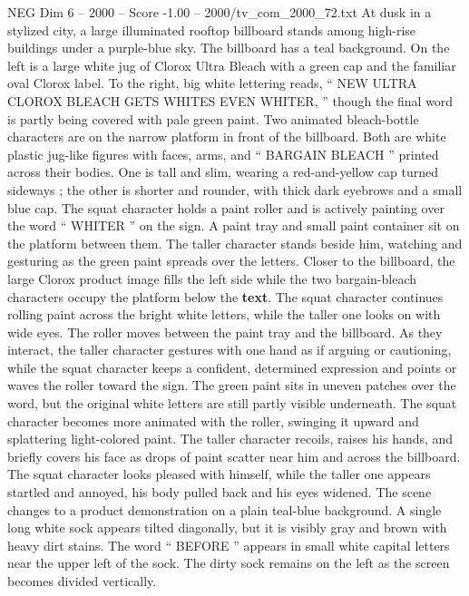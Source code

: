 \begin{textsample}{NEG Dim 6 – 2000 – Score -1.00 – 2000/tv\_com\_2000\_72.txt}  \label{ex:f6_neg_049}
At dusk in a stylized city, a large illuminated rooftop billboard stands among high-rise buildings under a purple-blue sky.
The billboard has a teal background.
On the left is a large white jug of Clorox Ultra Bleach with a green cap and the familiar oval Clorox label.
To the right, big white lettering reads, “ NEW ULTRA CLOROX BLEACH GETS WHITES EVEN WHITER, ” though the final word is partly being covered with pale green paint.
Two animated bleach-bottle characters are on the narrow platform in front of the billboard.
Both are white plastic jug-like figures with faces, arms, and “ BARGAIN BLEACH ” printed across their bodies.
One is tall and slim, wearing a red-and-yellow cap turned sideways ; the other is shorter and rounder, with thick dark eyebrows and a small blue cap.
The squat character holds a paint roller and is actively painting over the word “ WHITER ” on the sign.
A paint tray and small paint container sit on the platform between them.
The taller character stands beside him, watching and gesturing as the green paint spreads over the letters.
Closer to the billboard, the large Clorox product image fills the left side while the two bargain-bleach characters occupy the platform below the \textbf{text}.
The squat character continues rolling paint across the bright white letters, while the taller one looks on with wide eyes.
The roller moves between the paint tray and the billboard.
As they interact, the taller character gestures with one hand as if arguing or cautioning, while the squat character keeps a confident, determined expression and points or waves the roller toward the sign.
The green paint sits in uneven patches over the word, but the original white letters are still partly visible underneath.
The squat character becomes more animated with the roller, swinging it upward and splattering light-colored paint.
The taller character recoils, raises his hands, and briefly covers his face as drops of paint scatter near him and across the billboard.
The squat character looks pleased with himself, while the taller one appears startled and annoyed, his body pulled back and his eyes widened.
The scene changes to a product demonstration on a plain teal-blue background.
A single long white sock appears tilted diagonally, but it is visibly gray and brown with heavy dirt stains.
The word “ BEFORE ” appears in small white capital letters near the upper left of the sock.
The dirty sock remains on the left as the screen becomes divided vertically.

\end{textsample}
